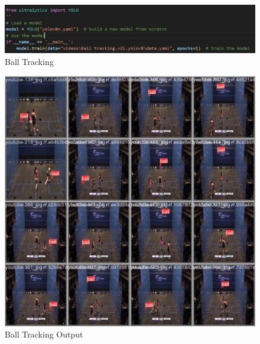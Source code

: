 \documentclass[12pt]{article}
\begin{document}
    \begin{figure}[H]
        \centering
        \includegraphics[width=1\linewidth]{figures/ball tracking.jpg}
        \caption{Ball Tracking}
        \label{fig:Ball tracking}
    \end{figure}
    \begin{figure}[H]
        \centering
        \includegraphics[width=1\linewidth]{figures/ball tracking output.jpg}
        \caption{Ball Tracking Output}
        \label{fig:Ball tracking output}
    \end{figure}
\end{document}

